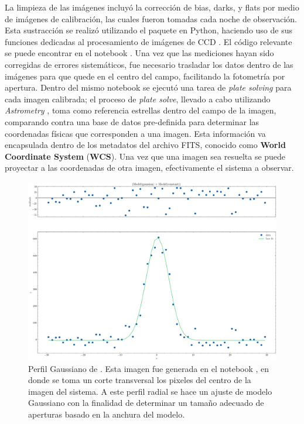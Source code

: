 La limpieza de las imágenes incluyó la corrección de bias, darks, y flats por
medio de imágenes de calibración, las cuales fueron tomadas cada noche de
observación. Esta sustracción se realizó utilizando el paquete  en
Python, haciendo uso de sus funciones dedicadas al procesamiento de imágenes de
CCD \autocite{ccdproc241}. El código relevante se puede encontrar en el notebook
\href{https://github.com/KnightIV/UANL_MAPTA_Observaciones/blob/main/analisis/iturbide/photometry_clean.ipynb}{}.
Una vez que las mediciones hayan sido corregidas de errores sistemáticos, fue
necesario trasladar los datos dentro de las imágenes para que \atoObjId quede en
el centro del campo, facilitando la fotometría por apertura. Dentro del mismo
notebook
\href{https://github.com/KnightIV/UANL_MAPTA_Observaciones/blob/main/analisis/iturbide/photometry_clean.ipynb}{}
se ejecutó una tarea de \textit{plate solving} para cada imagen calibrada; el
proceso de \textit{plate solve}, llevado a cabo utilizando \textit{Astrometry}
\autocite{astrometry}, toma como referencia estrellas dentro del campo de la
imagen, comparando contra una base de datos pre-definida para determinar las
coordenadas físicas que corresponden a una imagen. Esta información va
encapsulada dentro de los metadatos del archivo FITS, conocido como
\textbf{World Coordinate System} (\textbf{WCS}). Una vez que una imagen sea
resuelta se puede proyectar a las coordenadas de otra imagen, efectivamente
 el sistema a observar.

\begin{figure}[!ht]
	\centering
	\includegraphics[scale=0.44]{Observaciones/Secciones/Figures/Pixel Radial Profile - Gaussian.png}
	\caption{Perfil Gaussiano de \atoObjId. Esta imagen fue generada en el
	notebook
	\href{https://github.com/KnightIV/UANL_MAPTA_Observaciones/blob/main/analisis/iturbide/iraf/qphot_params_helper.ipynb}{},
	en donde se toma un corte transversal los pixeles del centro de la imagen
	del sistema. A este perfil radial se hace un ajuste de modelo Gaussiano con
	la finalidad de determinar un tamaño adecuado de aperturas basado en la
	anchura del modelo.}
	\label{pixelGaussProfile}
\end{figure}

